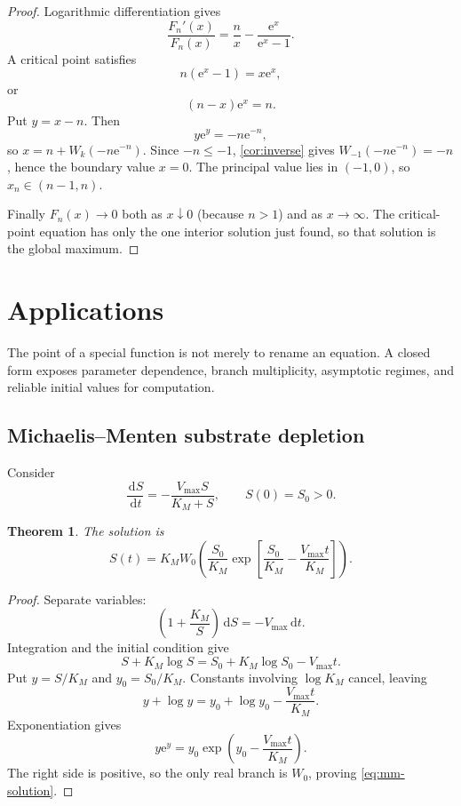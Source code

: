 \documentclass[11pt]{article}
\newtheorem{theorem}{Theorem}[section]
\theoremstyle{remark}
\newcommand{\ee}{\mathrm e}
\newcommand{\dd}{\,\mathrm d}
\begin{document}
\begin{proof}
Logarithmic differentiation gives
\[
 \frac{F_n'(x)}{F_n(x)}
 =\frac nx-\frac{\ee^x}{\ee^x-1}.
\]
A critical point satisfies
\[
       n(\ee^x-1)=x\ee^x,
\]
or
\[
       (n-x)\ee^x=n.
\]
Put \(y=x-n\).  Then
\[
       y\ee^y=-n\ee^{-n},
\]
so \(x=n+W_k(-n\ee^{-n})\).  Since \(-n\leq-1\),
\cref{cor:inverse} gives
\(W_{-1}(-n\ee^{-n})=-n\), hence the boundary value \(x=0\).
The principal value lies in \((-1,0)\), so
\(x_n\in(n-1,n)\).

Finally \(F_n(x)\to0\) both as \(x\downarrow0\) (because \(n>1\)) and as
\(x\to\infty\).  The critical-point equation has only the one interior
solution just found, so that solution is the global maximum.
\end{proof}

\section{Applications}\label{sec:applications}

The point of a special function is not merely to rename an equation.  A
closed form exposes parameter dependence, branch multiplicity, asymptotic
regimes, and reliable initial values for computation.

\subsection{Michaelis--Menten substrate depletion}

Consider
\begin{equation}\label{eq:mm-ode}
       \frac{\dd S}{\dd t}
       =-\frac{V_{\max}S}{K_M+S},
       \qquad S(0)=S_0>0.
\end{equation}

\begin{theorem}\label{thm:mm}
The solution is
\begin{equation}\label{eq:mm-solution}
 S(t)=K_M W_0\left(
 \frac{S_0}{K_M}
 \exp\left[
 \frac{S_0}{K_M}-\frac{V_{\max}t}{K_M}
 \right]\right).
\end{equation}
\end{theorem}

\begin{proof}
Separate variables:
\[
       \left(1+\frac{K_M}{S}\right)\dd S=-V_{\max}\dd t.
\]
Integration and the initial condition give
\[
       S+K_M\log S
       =S_0+K_M\log S_0-V_{\max}t.
\]
Put \(y=S/K_M\) and \(y_0=S_0/K_M\).  Constants involving
\(\log K_M\) cancel, leaving
\[
       y+\log y=y_0+\log y_0-\frac{V_{\max}t}{K_M}.
\]
Exponentiation gives
\[
       y\ee^y
       =y_0\exp\left(y_0-\frac{V_{\max}t}{K_M}\right).
\]
The right side is positive, so the only real branch is \(W_0\), proving
\eqref{eq:mm-solution}.
\end{proof}
\end{document}
